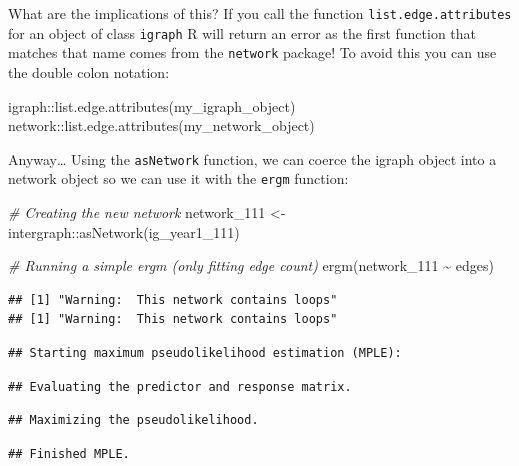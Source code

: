 \documentclass[
]{book}
\newenvironment{Shaded}{\begin{snugshade}}{\end{snugshade}}
\newcommand{\CommentTok}[1]{\textcolor[rgb]{0.56,0.35,0.01}{\textit{#1}}}
\newcommand{\FunctionTok}[1]{\textcolor[rgb]{0.00,0.00,0.00}{#1}}
\newcommand{\NormalTok}[1]{#1}
\newcommand{\OtherTok}[1]{\textcolor[rgb]{0.56,0.35,0.01}{#1}}
\newcommand{\SpecialCharTok}[1]{\textcolor[rgb]{0.00,0.00,0.00}{#1}}
\begin{document}
What are the implications of this? If you call the function \texttt{list.edge.attributes} for an object of class \texttt{igraph} R will return an error as the first function that matches that name comes from the \texttt{network} package! To avoid this you can use the double colon notation:

\begin{Shaded}
\begin{Highlighting}[]
\NormalTok{igraph}\SpecialCharTok{::}\FunctionTok{list.edge.attributes}\NormalTok{(my\_igraph\_object)}
\NormalTok{network}\SpecialCharTok{::}\FunctionTok{list.edge.attributes}\NormalTok{(my\_network\_object)}
\end{Highlighting}
\end{Shaded}

Anyway\ldots{} Using the \texttt{asNetwork} function, we can coerce the igraph object into a network object so we can use it with the \texttt{ergm} function:

\begin{Shaded}
\begin{Highlighting}[]
\CommentTok{\# Creating the new network}
\NormalTok{network\_111 }\OtherTok{\textless{}{-}}\NormalTok{ intergraph}\SpecialCharTok{::}\FunctionTok{asNetwork}\NormalTok{(ig\_year1\_111)}

\CommentTok{\# Running a simple ergm (only fitting edge count)}
\FunctionTok{ergm}\NormalTok{(network\_111 }\SpecialCharTok{\textasciitilde{}}\NormalTok{ edges)}
\end{Highlighting}
\end{Shaded}

\begin{verbatim}
## [1] "Warning:  This network contains loops"
## [1] "Warning:  This network contains loops"
\end{verbatim}

\begin{verbatim}
## Starting maximum pseudolikelihood estimation (MPLE):
\end{verbatim}

\begin{verbatim}
## Evaluating the predictor and response matrix.
\end{verbatim}

\begin{verbatim}
## Maximizing the pseudolikelihood.
\end{verbatim}

\begin{verbatim}
## Finished MPLE.
\end{verbatim}
\end{document}

